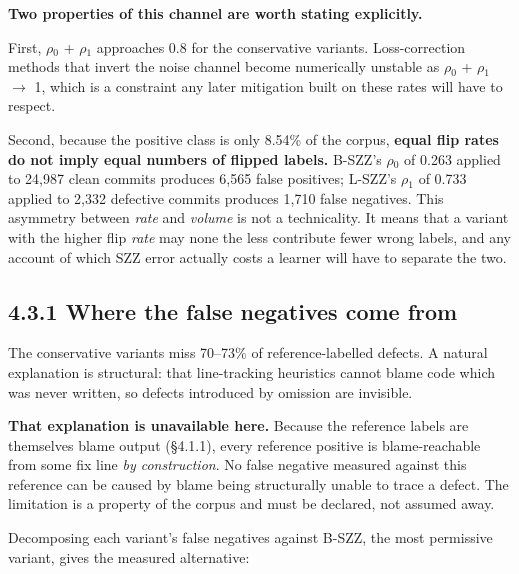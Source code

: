 \textbf{Two properties of this channel are worth stating explicitly.}

First, \ensuremath{\rho}\ensuremath{_0} + \ensuremath{\rho}\ensuremath{_1} approaches 0.8 for the conservative variants.
Loss-correction methods that invert the noise channel become numerically
unstable as \ensuremath{\rho}\ensuremath{_0} + \ensuremath{\rho}\ensuremath{_1} \ensuremath{\rightarrow} 1, which is a constraint any later mitigation
built on these rates will have to respect.

Second, because the positive class is only 8.54\% of the corpus,
\textbf{equal flip rates do not imply equal numbers of flipped labels.}
B-SZZ's \ensuremath{\rho}\ensuremath{_0} of 0.263 applied to 24,987 clean commits produces 6,565 false
positives; L-SZZ's \ensuremath{\rho}\ensuremath{_1} of 0.733 applied to 2,332 defective commits
produces 1,710 false negatives. This asymmetry between \emph{rate} and
\emph{volume} is not a technicality. It means that a variant with the
higher flip \emph{rate} may none the less contribute fewer wrong labels,
and any account of which SZZ error actually costs a learner will have to
separate the two.

\subsection{4.3.1 Where the false negatives come
from}\label{where-the-false-negatives-come-from}

The conservative variants miss 70--73\% of reference-labelled defects. A
natural explanation is structural: that line-tracking heuristics cannot
blame code which was never written, so defects introduced by omission
are invisible.

\textbf{That explanation is unavailable here.} Because the reference
labels are themselves blame output (\S{}4.1.1), every reference positive is
blame-reachable from some fix line \emph{by construction}. No false
negative measured against this reference can be caused by blame being
structurally unable to trace a defect. The limitation is a property of
the corpus and must be declared, not assumed away.

Decomposing each variant's false negatives against B-SZZ, the most
permissive variant, gives the measured alternative:

